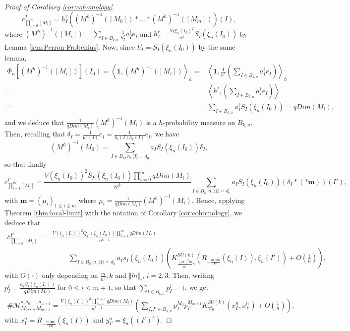 \documentclass[10pt,11pt]{amsart}%
\begin{document}
\begin{proof}[Proof of Corollary \ref{cor:cohomology}]
$$\overline{c}_{\prod_{i=0}^{m} [M_i]}^{I}=h^r_{I}\left( (M^h)^{-1}([M_0])*\dots *(M^h)^{-1}([M_{m}])\right)(I),$$
where $(M^h)^{-1}([M_i])=\sum_{I\in B_{k,n}}\frac{1}{h^r_I}a_{I}^ie_I$ and $h^r_I=\frac{V(\xi_{n}(I_0)^2}{n^k}S_{I}(\xi_{n}(I_0))$ by Lemma \ref{lem:Perron-Frobenius}. Now, since $h^l_I=S_{I}(\xi_{n}(I_0))$ by the same lemma,
\begin{align*}
\Phi_{n}\left[(M^h)^{-1}([M_i])\right](I_0)=\left\langle \mathbf{1},(M^h)^{-1}([M_i])\right\rangle_h=&\left\langle \mathbf{1},\frac{1}{h^r}\left(\sum_{I\in B_{k,n}}a^i_Ie_I\right)\right\rangle_h\\
=&\left\langle h^l,\left(\sum_{I\in B_{k,n}}a^i_Ie_I\right)\right\rangle\\
=&\sum_{I\in B_{k,n}}a^i_IS_{I}(\xi_{n}(I_0))=qDim(M_i),
\end{align*}
and we deduce that $\frac{1}{qDim(M_i)}(M^h)^{-1}(M_i)$ is a $h$-probability measure on $B_{k,n}$. Then, recalling that $\delta_I=\frac{1}{\mu^h(I)}e_I=\frac{1}{h_l(I)h_r(I)}e_I$, we have 
$$(M^h)^{-1}(M_0)=\sum_{I\in B_k,n, \langle I\rangle=d_0}a_IS_{I}(\xi_{n}(I_0))\delta_I,$$
so that finally 
$$\overline{c}_{\prod_{i=1}^{m} [M_i]}^{I'}=\frac{V(\xi_{n}(I_0))^2S_{I'}(\xi_{n}(I_0))\prod_{i=0}^m qDim(M_i)}{n^k}\sum_{I\in B_k,n, \langle I\rangle=d_0}a_{I}S_{I}(\xi_{n}(I_0))\left(\delta_I*(*\mathbf{m})\right)(I'),$$
with $\mathbf{m}=(\mu_i)_{1\leq i\leq m}$ where $\mu_i=\frac{1}{qDim(M_i)}(M^h)^{-1}(M_i)$. Hence, applying Theorem \ref{thm:local-limit} with the notation of Corollary \ref{cor:cohomology}, we deduce that 
\begin{align*}
\overline{c}_{\prod_{i=0}^{m} [M_i]}^{I'}=&\frac{V(\xi_{n}(I_0))^2Q_{I'}(\xi_{n}(I_0))\prod_{i=1}^m qDim(M_i)}{n^{k-1}}\\&\hspace{1cm}\sum_{I\in B_k,n, \langle I\rangle=d_0}a_{I}s_{I}(\xi_{n}(I_0))\left(K_{\frac{(2\pi)^2m}{n^2}\gamma}^{SU(k)}\left(R_{-\frac{m\langle \mathbf{m}\rangle}{kn}}\left(\xi_{n}(I)\right),\xi_{n}(I')\right)+O\left(\frac{1}{n}\right)\right),
\end{align*}
with $O(\cdot)$ only depending on $\frac{m}{n^2},k$ and $\Vert \tilde{m}\Vert_{i}$, $i=2,3$. Then, writing $p^i_I=\frac{a_IS_I(\xi_{n}(I_0))}{qDim(M_i)}$ for $0\leq i\leq m+1$, so that $\sum_{I\in B_{k,n}}p_I^i=1$, we get 
\begin{align*}
\#\mathcal{M}^{d,a_0,\ldots,a_{m+1}}_{M_0,\ldots,M_{m+1}}=\frac{V(\xi_{n}(I_0))^2\prod_{i=0}^{m+1}qDim(M_i)}{n^{k-1}}\left(\sum_{I,I'\in B_{k,n}}p_I^{M_0}p_{I'}^{M_{m+1}}K_{\gamma t_0}^{SU(k)}\left(x^n_I,x^n_{I'}\right)+O\left(\frac{1}{n}\right)\right),
\end{align*}
with $x_{I}^n=R_{-\frac{m\langle \mathbf{m}\rangle}{kn}}\left(\xi_{n}(I)\right)$ and $y_{I'}^n=\xi_{n}((I')^c)$.
\end{proof}
\end{document}
